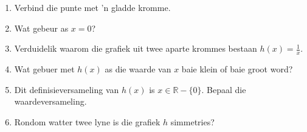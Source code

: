 \begin{wex}
{\begin{enumerate}[noitemsep, label=\textbf{\arabic*}. ] 
 \item Verbind die punte met 'n gladde kromme.
\item Wat gebeur as $x=0$?
\item Verduidelik waarom die grafiek uit twee aparte krommes bestaan $h(x)=\frac{1}{x}$.
\item Wat gebuer met $h(x)$ as die waarde van $x$ baie klein of baie groot word?
\item Dit definisieversameling van $h(x)$ is $x \in \mathbb{R} - \{0\}$. Bepaal die waardeversameling.
\item Rondom watter twee lyne is die grafiek $h$ simmetries?
\end{enumerate}
}
{
}
\end{wex}
